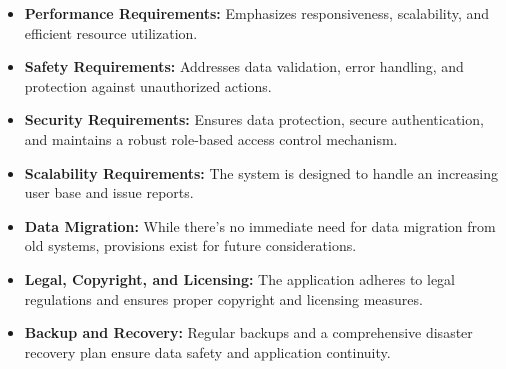 \begin{itemize}
    \item \textbf{Performance Requirements:} Emphasizes responsiveness, scalability, and efficient resource utilization.
    \item \textbf{Safety Requirements:} Addresses data validation, error handling, and protection against unauthorized actions.
    \item \textbf{Security Requirements:} Ensures data protection, secure authentication, and maintains a robust role-based access control mechanism.
    \item \textbf{Scalability Requirements:} The system is designed to handle an increasing user base and issue reports.
    \item \textbf{Data Migration:} While there's no immediate need for data migration from old systems, provisions exist for future considerations.
    \item \textbf{Legal, Copyright, and Licensing:} The application adheres to legal regulations and ensures proper copyright and licensing measures.
    \item \textbf{Backup and Recovery:} Regular backups and a comprehensive disaster recovery plan ensure data safety and application continuity.
\end{itemize}